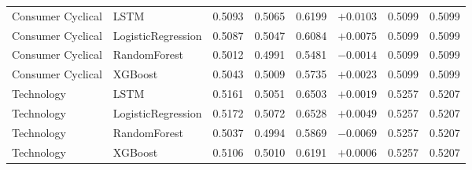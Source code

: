 \begin{longtable}{llrrrrrr}
Consumer Cyclical & LSTM & 0.5093 & 0.5065 & 0.6199 & $+0.0103$ & 0.5099 & 0.5099 \\
Consumer Cyclical & LogisticRegression & 0.5087 & 0.5047 & 0.6084 & $+0.0075$ & 0.5099 & 0.5099 \\
Consumer Cyclical & RandomForest & 0.5012 & 0.4991 & 0.5481 & $-0.0014$ & 0.5099 & 0.5099 \\
Consumer Cyclical & XGBoost & 0.5043 & 0.5009 & 0.5735 & $+0.0023$ & 0.5099 & 0.5099 \\
Technology & LSTM & 0.5161 & 0.5051 & 0.6503 & $+0.0019$ & 0.5257 & 0.5207 \\
Technology & LogisticRegression & 0.5172 & 0.5072 & 0.6528 & $+0.0049$ & 0.5257 & 0.5207 \\
Technology & RandomForest & 0.5037 & 0.4994 & 0.5869 & $-0.0069$ & 0.5257 & 0.5207 \\
Technology & XGBoost & 0.5106 & 0.5010 & 0.6191 & $+0.0006$ & 0.5257 & 0.5207 \\
\end{longtable}
